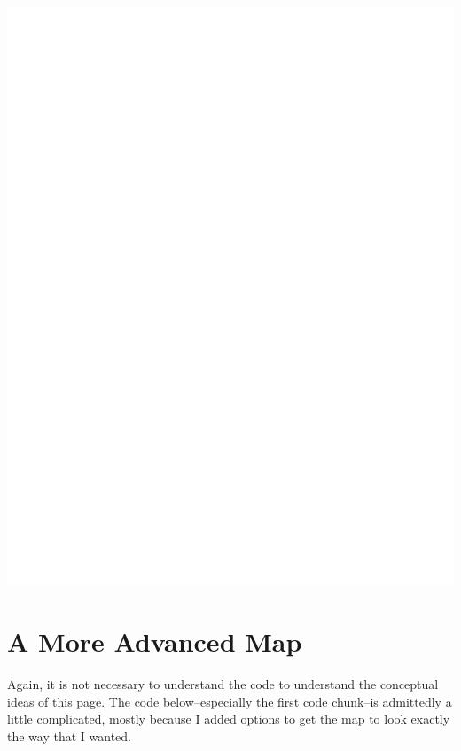 \documentclass[
  letterpaper,
  DIV=11,
  numbers=noendperiod,
  oneside]{scrreprt}
\begin{document}
\includegraphics{projections_files/figure-pdf/unnamed-chunk-3-1.pdf}

\section{A More Advanced Map}\label{a-more-advanced-map}

\begin{tcolorbox}[enhanced jigsaw, coltitle=black, breakable, leftrule=.75mm, opacityback=0, colback=white, bottomtitle=1mm, left=2mm, toptitle=1mm, toprule=.15mm, opacitybacktitle=0.6, rightrule=.15mm, titlerule=0mm, colframe=quarto-callout-note-color-frame, bottomrule=.15mm, title=\textcolor{quarto-callout-note-color}{\faInfo}\hspace{0.5em}{Note}, colbacktitle=quarto-callout-note-color!10!white, arc=.35mm]

Again, it is not necessary to understand the code to understand the
conceptual ideas of this page. The code below--especially the first code
chunk--is admittedly a little complicated, mostly because I added
options to get the map to look exactly the way that I wanted.

\end{tcolorbox}
\end{document}
